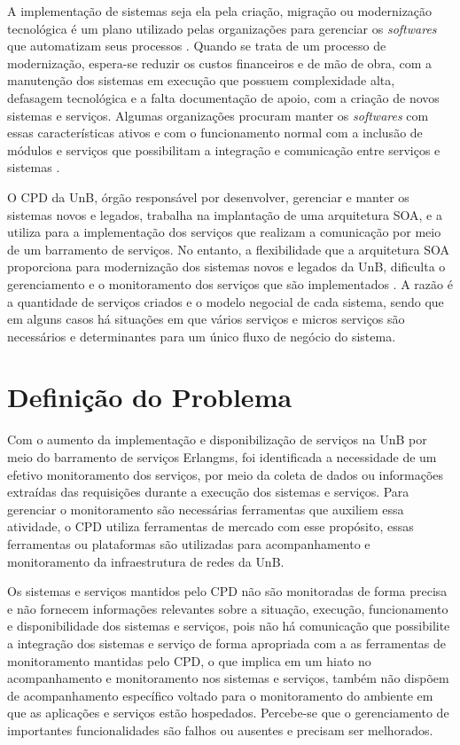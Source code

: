 \label{Introducao}

A implementação de sistemas seja ela pela criação, migração ou modernização tecnológica é um plano utilizado pelas organizações para gerenciar os \textit{softwares} que automatizam seus processos \cite{Agilar}. Quando se trata de um processo de modernização, espera-se reduzir os custos financeiros e de mão de obra, com a manutenção dos sistemas em execução que possuem complexidade alta, defasagem tecnológica e a falta documentação de apoio, com a criação de novos sistemas e serviços. Algumas organizações procuram manter os \textit{softwares} com essas características ativos e com o funcionamento normal com a inclusão de módulos e serviços que possibilitam a integração e comunicação entre serviços e sistemas \cite{Agilar}.

O \acrshort{CPD} da \acrshort{UnB}, órgão responsável por desenvolver, gerenciar e manter os sistemas novos e legados, trabalha na implantação de uma arquitetura \acrshort{SOA}, e a utiliza para a implementação dos serviços que realizam a comunicação por meio de um barramento de serviços. No entanto, a flexibilidade que a arquitetura \acrshort{SOA} proporciona para modernização dos sistemas novos e legados da \acrshort{UnB}, dificulta o gerenciamento e o monitoramento dos serviços que são implementados \cite{Agilar}. A razão é a quantidade de serviços criados e o modelo negocial de cada sistema, sendo que em alguns casos há situações em que vários serviços e micros serviços são necessários e determinantes para um único fluxo de negócio do sistema.


\section{Definição do Problema}
Com o aumento da implementação e disponibilização de serviços na \acrshort{UnB} por meio do barramento de serviços Erlangms\cite{Agilar}, foi identificada a necessidade de um efetivo monitoramento dos serviços, por meio da coleta de dados ou informações extraídas das requisições durante a execução dos sistemas e serviços. Para gerenciar o monitoramento são necessárias ferramentas que auxiliem essa atividade, o \acrshort{CPD} utiliza ferramentas de mercado com esse propósito, essas ferramentas ou plataformas são utilizadas para acompanhamento e monitoramento da infraestrutura de redes da \acrshort{UnB}.

Os sistemas e serviços mantidos pelo \acrshort{CPD} não são monitoradas de forma precisa e não fornecem informações relevantes sobre a situação, execução, funcionamento e disponibilidade dos sistemas e serviços, pois não há comunicação que possibilite a integração dos sistemas e serviço de forma apropriada com a as ferramentas de monitoramento mantidas pelo \acrshort{CPD}, o que implica em um hiato no acompanhamento e monitoramento nos sistemas e serviços, também não dispõem de acompanhamento específico voltado para o monitoramento do ambiente em que as aplicações e serviços estão hospedados. Percebe-se que o gerenciamento de importantes funcionalidades são falhos ou ausentes e precisam ser melhorados.

